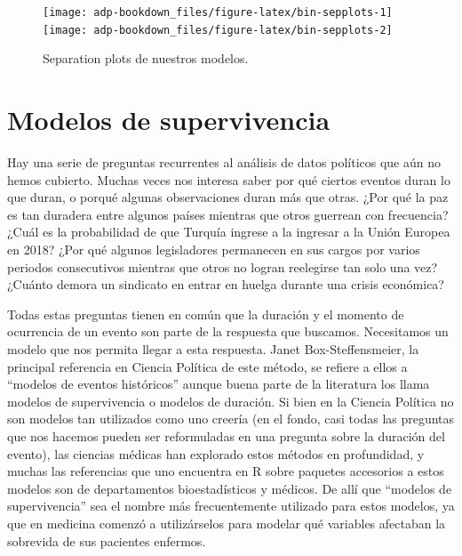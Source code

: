 \documentclass[]{book}
\begin{document}
\begin{figure}

{\centering \texttt{[image: adp-bookdown\_files/figure-latex/bin-sepplots-1]} \texttt{[image: adp-bookdown\_files/figure-latex/bin-sepplots-2]} 

}

\caption{Separation plots de nuestros modelos.}\label{fig:bin-sepplots}
\end{figure}

\chapter{Modelos de supervivencia}\label{surv}

Hay una serie de preguntas recurrentes al análisis de datos políticos
que aún no hemos cubierto. Muchas veces nos interesa saber por qué
ciertos eventos duran lo que duran, o porqué algunas observaciones duran
más que otras. ¿Por qué la paz es tan duradera entre algunos países
mientras que otros guerrean con frecuencia? ¿Cuál es la probabilidad de
que Turquía ingrese a la ingresar a la Unión Europea en 2018? ¿Por qué
algunos legisladores permanecen en sus cargos por varios periodos
consecutivos mientras que otros no logran reelegirse tan solo una vez?
¿Cuánto demora un sindicato en entrar en huelga durante una crisis
económica?

Todas estas preguntas tienen en común que la duración y el momento de
ocurrencia de un evento son parte de la respuesta que buscamos.
Necesitamos un modelo que nos permita llegar a esta respuesta. Janet
Box-Steffensmeier, la principal referencia en Ciencia Política de este
método, se refiere a ellos a ``modelos de eventos históricos'' aunque
buena parte de la literatura los llama modelos de supervivencia o
modelos de duración. Si bien en la Ciencia Política no son modelos tan
utilizados como uno creería (en el fondo, casi todas las preguntas que
nos hacemos pueden ser reformuladas en una pregunta sobre la duración
del evento), las ciencias médicas han explorado estos métodos en
profundidad, y muchas las referencias que uno encuentra en R sobre
paquetes accesorios a estos modelos son de departamentos bioestadísticos
y médicos. De allí que ``modelos de supervivencia'' sea el nombre más
frecuentemente utilizado para estos modelos, ya que en medicina comenzó
a utilizárselos para modelar qué variables afectaban la sobrevida de sus
pacientes enfermos.
\end{document}
